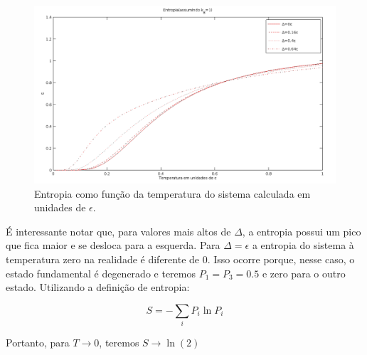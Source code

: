 \begin{figure}[!h]
\includegraphics[scale=.3]{entropy}
\caption{Entropia como função da temperatura do sistema calculada em unidades de $\epsilon$.}
\label{S}
\end{figure}

É interessante notar que, para valores mais altos de $\Delta$, a entropia possui um pico que fica maior e se desloca para a esquerda. Para $\Delta=\epsilon$ a entropia do sistema à temperatura zero na realidade é diferente de 0. Isso ocorre porque, nesse caso, o estado fundamental é degenerado e teremos $P_1=P_3=0.5$ e zero para o outro estado. Utilizando a definição de entropia:

\begin{equation}
S=-\sum_i P_i \ln P_i
\end{equation}

Portanto, para $T \rightarrow 0$, teremos $S\rightarrow\ln(2)$